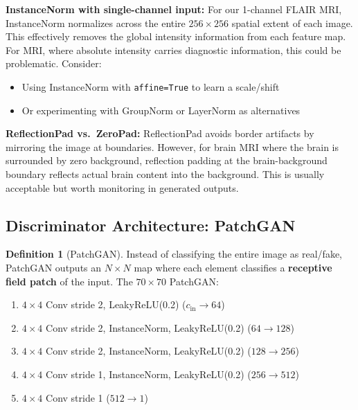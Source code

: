 \documentclass[11pt,a4paper]{article}
\theoremstyle{definition}
\newtheorem{definition}{Definition}[section]
\begin{document}
\begin{edgecase}
\textbf{InstanceNorm with single-channel input:} For our 1-channel FLAIR MRI, InstanceNorm normalizes across the entire $256 \times 256$ spatial extent of each image. This effectively removes the global intensity information from each feature map. For MRI, where absolute intensity carries diagnostic information, this could be problematic. Consider:
\begin{itemize}
    \item Using InstanceNorm with \texttt{affine=True} to learn a scale/shift
    \item Or experimenting with GroupNorm or LayerNorm as alternatives
\end{itemize}
\end{edgecase}

\begin{edgecase}
\textbf{ReflectionPad vs.\ ZeroPad:} ReflectionPad avoids border artifacts by mirroring the image at boundaries. However, for brain MRI where the brain is surrounded by zero background, reflection padding at the brain-background boundary reflects actual brain content into the background. This is usually acceptable but worth monitoring in generated outputs.
\end{edgecase}

\subsection{Discriminator Architecture: PatchGAN}

\begin{definition}[PatchGAN]
Instead of classifying the entire image as real/fake, PatchGAN outputs an $N \times N$ map where each element classifies a \textbf{receptive field patch} of the input. The $70 \times 70$ PatchGAN:
\begin{enumerate}
    \item $4 \times 4$ Conv stride 2, LeakyReLU(0.2) ($c_{\text{in}} \to 64$)
    \item $4 \times 4$ Conv stride 2, InstanceNorm, LeakyReLU(0.2) ($64 \to 128$)
    \item $4 \times 4$ Conv stride 2, InstanceNorm, LeakyReLU(0.2) ($128 \to 256$)
    \item $4 \times 4$ Conv stride 1, InstanceNorm, LeakyReLU(0.2) ($256 \to 512$)
    \item $4 \times 4$ Conv stride 1 ($512 \to 1$)
\end{enumerate}
\end{definition}
\end{document}

